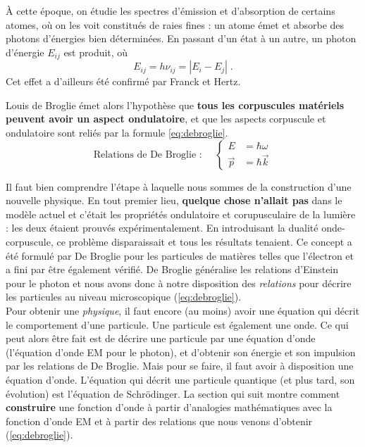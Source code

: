 \documentclass[12pt, a4paper]{book}
\begin{document}
À cette époque, on étudie les spectres d'émission et d'absorption de certains atomes, où on les voit constitués de raies fines : un atome émet et absorbe des photons d'énergies bien déterminées. En passant d'un état à un autre, un photon d'énergie $E_{ij}$ est produit, où
$$E_{ij} = h\nu_{ij} = |E_i - E_j| \; .$$
Cet effet a d'ailleurs été confirmé par Franck et Hertz. \\


Louis de Broglie émet alors l'hypothèse que \textbf{tous les corpuscules matériels peuvent avoir un aspect ondulatoire}, et que les aspects corpuscule et ondulatoire sont reliés par la formule \eqref{eq:debroglie}.
\begin{equation} \label{eq:debroglie}
\boxed{
\text{Relations de De Broglie : } \quad \left\{ \begin{array}{ll}
E &= \hbar \omega \\
\vec p &= \hbar \vec k
\end{array} \right. } 
\end{equation}

Il faut bien comprendre l'étape à laquelle nous sommes de la construction d'une nouvelle physique. En tout premier lieu, \textbf{quelque chose n'allait pas} dans le modèle actuel et c'était les propriétés ondulatoire et corupusculaire de la lumière : les deux étaient prouvés expérimentalement. En introduisant la dualité onde-corpuscule, ce problème disparaissait et tous les résultats tenaient. Ce concept a été formulé par De Broglie pour les particules de matières telles que l'électron et a fini par être également vérifié. De Broglie généralise les relations d'Einstein pour le photon et nous avons donc à notre disposition des \textit{relations} pour décrire les particules au niveau microscopique (\ref{eq:debroglie}). \\

Pour obtenir une \textit{physique}, il faut encore (au moins) avoir une équation qui décrit le comportement d'une particule. Une particule est également une onde. Ce qui peut alors être fait est de décrire une particule par une équation d'onde (l'équation d'onde EM pour le photon), et d'obtenir son énergie et son impulsion par les relations de De Broglie. Mais pour se faire, il faut avoir à disposition une équation d'onde. L'équation qui décrit une particule quantique (et plus tard, son évolution) est l'équation de Schrödinger. La section qui suit montre comment \textbf{construire} une fonction d'onde à partir d'analogies mathématiques avec la fonction d'onde EM et à partir des relations que nous venons d'obtenir (\ref{eq:debroglie}).
\end{document}

